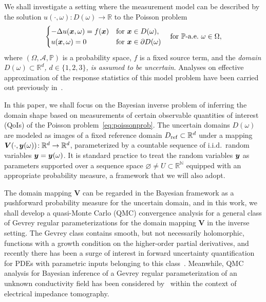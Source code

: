 \documentclass[graybox]{svmult}
\begin{document}
We shall investigate a setting where the measurement model can be described by the solution $u(\cdot,\omega)\!:D(\omega)\to \mathbb R$ to the Poisson problem
\begin{align}\label{eq:poissonprob}
\begin{cases}
-\Delta u({\boldsymbol{x}},\omega)=f({\boldsymbol{x}})&\text{for}~{\boldsymbol{x}}\in D(\omega),\\
u({\boldsymbol{x}},\omega)=0&\text{for}~{\boldsymbol{x}}\in\partial D(\omega)
\end{cases}\quad\text{for $\mathbb P$-a.e.}~\omega\in \Omega,
\end{align}
where $(\Omega,\mathcal A,\mathbb P)$ is a probability space, $f$ is a fixed source term, and the {\textit{domain $D(\omega)\subset\mathbb R^d$, $d\in\{1,2,3\}$, is assumed to be uncertain}}. Analyses on effective approximation of the response statistics of this model problem have been carried out previously in~\cite{canote16,ChDjEl20,djurdjevac24,harbrecht16,xiu06}. 

In this paper, we shall focus on the Bayesian inverse problem of inferring the domain shape based on measurements of certain observable quantities of interest (QoIs) of the Poisson problem~\eqref{eq:poissonprob}. The uncertain domains $D(\omega)$ are modeled as images of a fixed reference domain $D_{\rm ref}\subset\mathbb R^d$ under a mapping $\boldsymbol V(\cdot,{\boldsymbol{y}}(\omega))\!:\mathbb R^d\to \mathbb R^d$, parameterized by a countable sequence of i.i.d.~random variables ${\boldsymbol{y}}={\boldsymbol{y}}(\omega)$. It is standard practice to treat the random variables ${\boldsymbol{y}}$ as parameters supported over a sequence space $\varnothing\neq U\subset\mathbb R^{\mathbb N}$ equipped with an appropriate probability measure, a framework that we will also adopt.

The domain mapping $\boldsymbol V$ can be regarded in the Bayesian framework as a pushforward probability measure for the uncertain domain, and in this work, we shall develop a quasi-Monte Carlo (QMC) convergence analysis for a general class of Gevrey regular parameterizations for the domain mapping $\boldsymbol V$ in the inverse setting. The Gevrey class contains smooth, but not necessarily holomorphic, functions with a growth condition on the higher-order partial derivatives, and recently there has been a surge of interest in forward uncertainty quantification for PDEs with parametric inputs belonging to this class~\cite{chernov1,chernov2,gk24gevrey,harbrecht24}. Meanwhile, QMC analysis for Bayesian inference of a Gevrey regular parameterization of an unknown conductivity field has been considered by~\cite{BaKaLa24} within the context of electrical impedance tomography.
\end{document}
